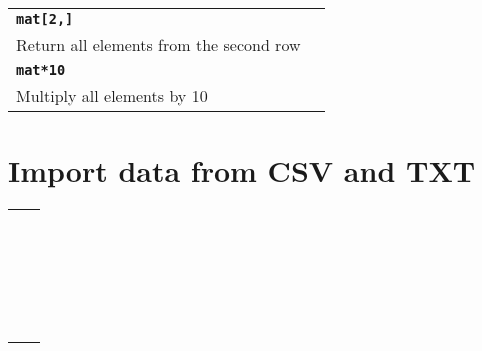 \documentclass{article}
\begin{document}
\begin{multicols}{2}
\begin{tabularx}{\textwidth/2}{X|l}
    \texttt{\textbf{mat[2,]}}\\
    \color{lightgray3}Return all elements from the second row\\
    \hline
    
    \texttt{\textbf{mat*10}}\\
    \color{lightgray3}Multiply all elements by 10\\
    \hline
  \end{tabularx}
  
  \section{\textbf{Import data from CSV and TXT}}
  \begin{tabularx}{\textwidth/2}{X|l}  
     \texttt{\textbf{}}\\
    \\
    \hline
    
    \texttt{\textbf{}}\\
    \\
    \hline
    
     \texttt{\textbf{}}\\
    \\
    \hline
    
    \texttt{\textbf{}}\\
    \\
    \hline
    
     \texttt{\textbf{}}\\
    \\
    \hline
    
    \texttt{\textbf{}}\\
    \\
    \hline
    
     \texttt{\textbf{}}\\
    \\
    \hline
    
    \texttt{\textbf{}}\\
    \\
    \hline
    
    \texttt{\textbf{}}\\
    \\
    \hline
    
     \texttt{\textbf{}}\\
    \\
    \hline
    
    \texttt{\textbf{}}\\
    \\
    \hline
    

\end{tabularx}
\end{multicols}
\end{document}
